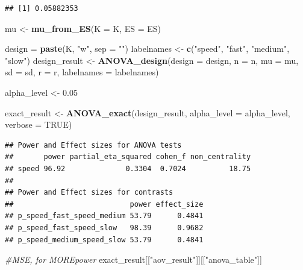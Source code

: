 \documentclass[]{book}
\newenvironment{Shaded}{\begin{snugshade}}{\end{snugshade}}
\newcommand{\CommentTok}[1]{\textcolor[rgb]{0.56,0.35,0.01}{\textit{#1}}}
\newcommand{\DataTypeTok}[1]{\textcolor[rgb]{0.13,0.29,0.53}{#1}}
\newcommand{\FloatTok}[1]{\textcolor[rgb]{0.00,0.00,0.81}{#1}}
\newcommand{\KeywordTok}[1]{\textcolor[rgb]{0.13,0.29,0.53}{\textbf{#1}}}
\newcommand{\NormalTok}[1]{#1}
\newcommand{\OtherTok}[1]{\textcolor[rgb]{0.56,0.35,0.01}{#1}}
\newcommand{\StringTok}[1]{\textcolor[rgb]{0.31,0.60,0.02}{#1}}
\begin{document}
\begin{verbatim}
## [1] 0.05882353
\end{verbatim}

\begin{Shaded}
\begin{Highlighting}[]
\NormalTok{mu <-}\StringTok{ }\KeywordTok{mu_from_ES}\NormalTok{(}\DataTypeTok{K =}\NormalTok{ K, }\DataTypeTok{ES =}\NormalTok{ ES)}

\NormalTok{design =}\StringTok{ }\KeywordTok{paste}\NormalTok{(K, }\StringTok{"w"}\NormalTok{, }\DataTypeTok{sep =} \StringTok{""}\NormalTok{)}
\NormalTok{labelnames <-}\StringTok{ }\KeywordTok{c}\NormalTok{(}\StringTok{"speed"}\NormalTok{, }\StringTok{"fast"}\NormalTok{, }\StringTok{"medium"}\NormalTok{, }\StringTok{"slow"}\NormalTok{)}
\NormalTok{design_result <-}\StringTok{ }\KeywordTok{ANOVA_design}\NormalTok{(}\DataTypeTok{design =}\NormalTok{ design,}
                   \DataTypeTok{n =}\NormalTok{ n, }
                   \DataTypeTok{mu =}\NormalTok{ mu, }
                   \DataTypeTok{sd =}\NormalTok{ sd, }
                   \DataTypeTok{r =}\NormalTok{ r, }
                   \DataTypeTok{labelnames =}\NormalTok{ labelnames)}

\NormalTok{alpha_level <-}\StringTok{ }\FloatTok{0.05}

\NormalTok{exact_result <-}\StringTok{ }\KeywordTok{ANOVA_exact}\NormalTok{(design_result,}
                            \DataTypeTok{alpha_level =}\NormalTok{ alpha_level,}
                            \DataTypeTok{verbose =} \OtherTok{TRUE}\NormalTok{)}
\end{Highlighting}
\end{Shaded}

\begin{verbatim}
## Power and Effect sizes for ANOVA tests
##       power partial_eta_squared cohen_f non_centrality
## speed 96.92              0.3304  0.7024          18.75
## 
## Power and Effect sizes for contrasts
##                           power effect_size
## p_speed_fast_speed_medium 53.79      0.4841
## p_speed_fast_speed_slow   98.39      0.9682
## p_speed_medium_speed_slow 53.79      0.4841
\end{verbatim}

\begin{Shaded}
\begin{Highlighting}[]
\CommentTok{#MSE, for MOREpower}
\NormalTok{exact_result[[}\StringTok{"aov_result"}\NormalTok{]][[}\StringTok{"anova_table"}\NormalTok{]]}
\end{Highlighting}
\end{Shaded}
\end{document}
